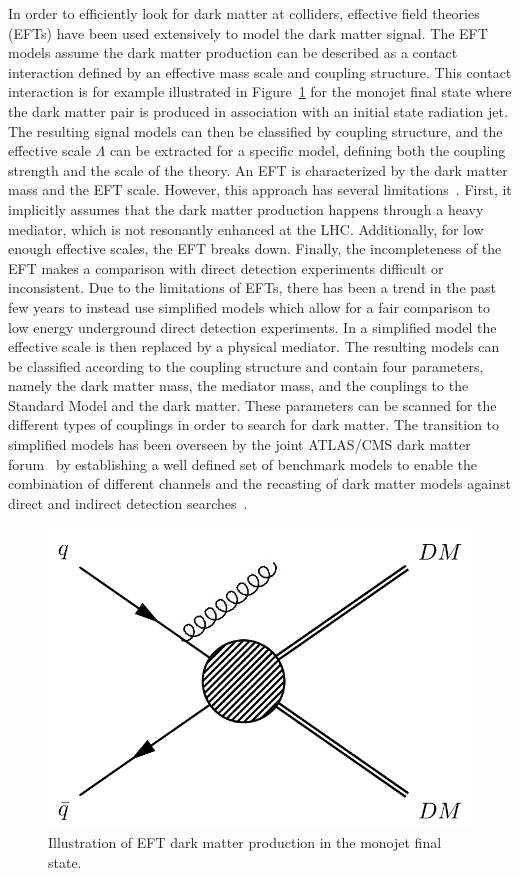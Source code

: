 In order to efficiently look for dark matter at colliders, effective field theories (EFTs) have been used extensively to model the dark matter signal. The EFT models assume the dark matter production can be described as a contact interaction defined by an effective mass scale and coupling structure. This contact interaction is for example illustrated in Figure~\ref{fig:monojet_diagram} for the monojet final state where the dark matter pair is produced in association with an initial state radiation jet. The resulting signal models can then be classified by coupling structure, and the effective scale $\Lambda$ can be extracted for a specific model, defining both the coupling strength and the scale of the theory. An EFT is characterized by the dark matter mass and the EFT scale. However, this approach has several limitations~\cite{Busoni:2013lha,Busoni:2014sya,Busoni:2014haa}. First, it implicitly assumes that the dark matter production happens through a heavy mediator, which is not resonantly enhanced at the \ac{LHC}. Additionally, for low enough effective scales, the EFT breaks down. Finally, the incompleteness of the EFT makes a comparison with direct detection experiments difficult or inconsistent. Due to the limitations of EFTs, there has been a trend in the past few years to instead use simplified models which allow for a fair comparison to low energy underground direct detection experiments. In a simplified model the effective scale is then replaced by a physical mediator. The resulting models can be classified according to the coupling structure and contain four parameters, namely the dark matter mass, the mediator mass, and the couplings to the Standard Model and the dark matter. These parameters can be scanned for the different types of couplings in order to search for dark matter. The transition to simplified models has been overseen by the joint \acs{ATLAS}/\acs{CMS} dark matter forum~\cite{Abercrombie:2015wmb} by establishing a well defined set of benchmark models to enable the combination of different channels and the recasting of dark matter models against direct and indirect detection searches~\cite{Boveia:2016mrp}.

\begin{figure}[ht]
  \centering
 \includegraphics[width=.4\textwidth]{monojet.png} 
 \caption{Illustration of EFT dark matter production in the monojet final state.}
 \label{fig:monojet_diagram}
\end{figure}

